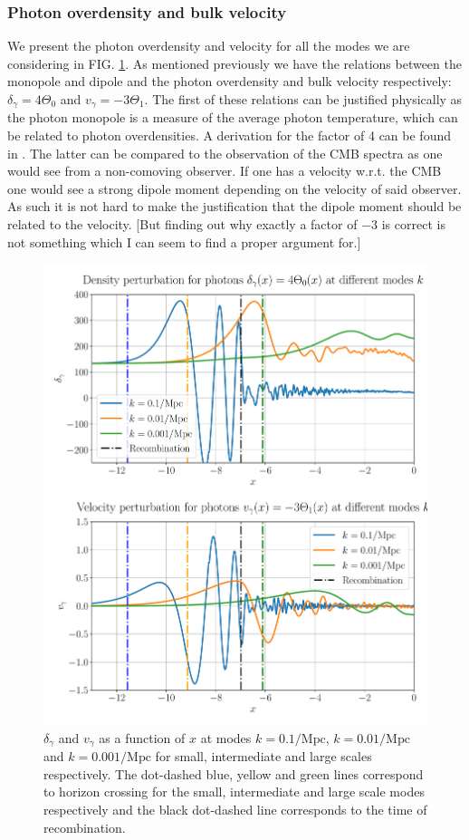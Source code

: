 \documentclass[%
reprint,
 amsmath,amssymb,
 aps,
]{revtex4-2}
\begin{document}
\subsubsection{Photon overdensity and bulk velocity}
We present the photon overdensity and velocity for all the modes we are considering in FIG. \ref{fig:gamma}. As mentioned previously we have the relations between the monopole and dipole and the photon overdensity and bulk velocity respectively: $\delta_\gamma=4\Theta_0$ and $v_\gamma=-3\Theta_1$.  The first of these relations can be justified physically as the photon monopole is a measure of the average photon temperature, which can be related to photon overdensities. A derivation for the factor of 4 can be found in \cite{AST5220LectureNotes}. The latter can be compared to the observation of the CMB spectra as one would see from a non-comoving observer. If one has a velocity w.r.t. the CMB one would see a strong dipole moment depending on the velocity of said observer. As such it is not hard to make the justification that the dipole moment should be related to the velocity. \color{red}[But finding out why exactly a factor of $-3$ is correct is not something which I can seem to find a proper argument for.]\color{black}

\begin{figure}[ht!]
	\includegraphics[width = \linewidth]{Figures/gamma.pdf}
	\caption{$\delta_\gamma$ and $v_\gamma$ as a function of $x$ at modes $k=0.1/\text{Mpc}$, $k=0.01/\text{Mpc}$ and $k=0.001/\text{Mpc}$ for small, intermediate and large scales respectively. The dot-dashed blue, yellow and green lines correspond to horizon crossing for the small, intermediate and large scale modes respectively and the black dot-dashed line corresponds to the time of recombination.}
	\label{fig:gamma}
\end{figure}
\end{document}
